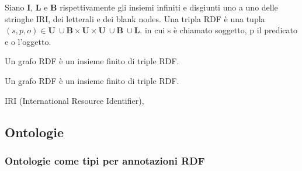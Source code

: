 \begin{definition}
	Siano \textbf{I}, \textbf{L} e \textbf{B} rispettivamente gli insiemi infiniti e disgiunti uno a uno delle stringhe IRI, dei letterali e dei blank nodes. Una tripla RDF è una tupla $(s, p, o) \in \textbf{U}\ \cup \textbf{B} \times \textbf{U} \times \textbf{U}\ \cup \textbf{B}\ \cup \textbf{L}.$ in cui s è chiamato soggetto, p il predicato e o l'oggetto.
\end{definition}
\begin{definition}
	Un grafo RDF è un insieme finito di triple RDF.
\end{definition}
\begin{definition}
	Un grafo RDF è un insieme finito di triple RDF.
\end{definition}
IRI (International Resource Identifier),



\subsection{Ontologie}
\subsubsection[Ontologie come tipi per RDF]{Ontologie come tipi per annotazioni RDF}